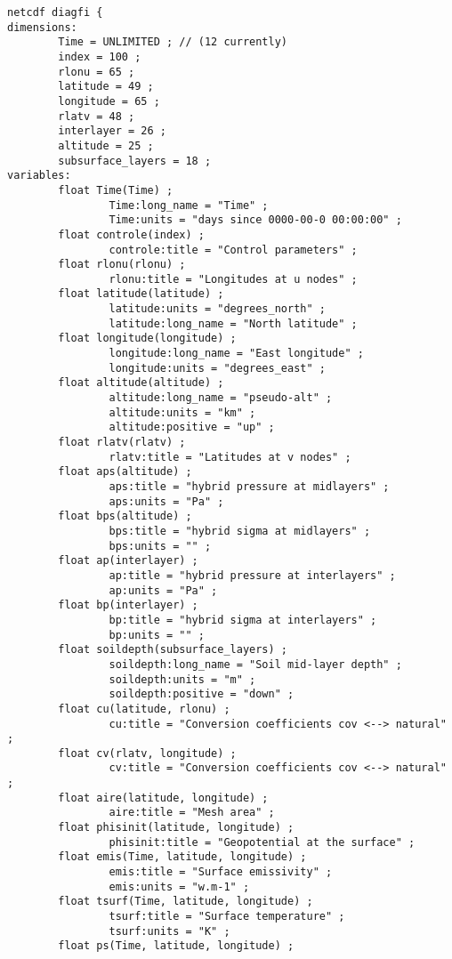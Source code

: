 {\footnotesize
\begin{verbatim}
netcdf diagfi {
dimensions:
        Time = UNLIMITED ; // (12 currently)
        index = 100 ;
        rlonu = 65 ;
        latitude = 49 ;
        longitude = 65 ;
        rlatv = 48 ;
        interlayer = 26 ;
        altitude = 25 ;
        subsurface_layers = 18 ;
variables:
        float Time(Time) ;
                Time:long_name = "Time" ;
                Time:units = "days since 0000-00-0 00:00:00" ;
        float controle(index) ;
                controle:title = "Control parameters" ;
        float rlonu(rlonu) ;
                rlonu:title = "Longitudes at u nodes" ;
        float latitude(latitude) ;
                latitude:units = "degrees_north" ;
                latitude:long_name = "North latitude" ;
        float longitude(longitude) ;
                longitude:long_name = "East longitude" ;
                longitude:units = "degrees_east" ;
        float altitude(altitude) ;
                altitude:long_name = "pseudo-alt" ;
                altitude:units = "km" ;
                altitude:positive = "up" ;
        float rlatv(rlatv) ;
                rlatv:title = "Latitudes at v nodes" ;
        float aps(altitude) ;
                aps:title = "hybrid pressure at midlayers" ;
                aps:units = "Pa" ;
        float bps(altitude) ;
                bps:title = "hybrid sigma at midlayers" ;
                bps:units = "" ;
        float ap(interlayer) ;
                ap:title = "hybrid pressure at interlayers" ;
                ap:units = "Pa" ;
        float bp(interlayer) ;
                bp:title = "hybrid sigma at interlayers" ;
                bp:units = "" ;
        float soildepth(subsurface_layers) ;
                soildepth:long_name = "Soil mid-layer depth" ;
                soildepth:units = "m" ;
                soildepth:positive = "down" ;
        float cu(latitude, rlonu) ;
                cu:title = "Conversion coefficients cov <--> natural" ;
        float cv(rlatv, longitude) ;
                cv:title = "Conversion coefficients cov <--> natural" ;
        float aire(latitude, longitude) ;
                aire:title = "Mesh area" ;
        float phisinit(latitude, longitude) ;
                phisinit:title = "Geopotential at the surface" ;
        float emis(Time, latitude, longitude) ;
                emis:title = "Surface emissivity" ;
                emis:units = "w.m-1" ;
        float tsurf(Time, latitude, longitude) ;
                tsurf:title = "Surface temperature" ;
                tsurf:units = "K" ;
        float ps(Time, latitude, longitude) ;

\end{verbatim}}

